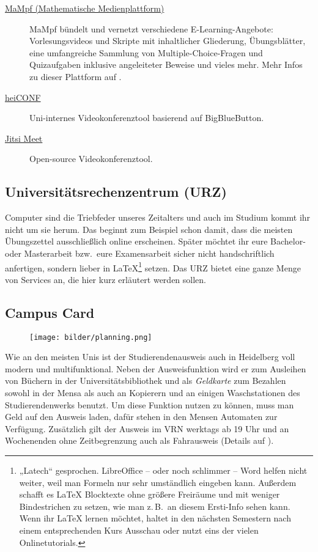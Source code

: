 \begin{description}
	\item[\href{https://mampf.mathi.uni-heidelberg.de}{MaMpf (Mathematische Medienplattform)}]
    MaMpf bündelt und vernetzt verschiedene E-Learning-Angebote: Vorlesungsvideos und Skripte mit inhaltlicher Gliederung, Übungsblätter, eine umfangreiche Sammlung von Multiple-Choice-Fragen und Quizaufgaben inklusive angeleiteter Beweise und vieles mehr. Mehr Infos zu dieser Plattform auf .

	\item[\href{https://heiconf.uni-heidelberg.de}{heiCONF}]
    Uni-internes Videokonferenztool basierend auf BigBlueButton.

	\item[\href{https://meet.jit.si/}{Jitsi Meet}]
    Open-source Videokonferenztool.
\end{description}


\subsection{Universitätsrechenzentrum (URZ)}
\label{urz}
Computer sind die Triebfeder unseres Zeitalters und auch im Studium kommt ihr nicht um sie herum. Das beginnt zum Beispiel schon damit, dass die meisten Übungszettel ausschließlich online erscheinen. Später möchtet ihr eure Bachelor- oder Masterarbeit bzw.\ eure Examensarbeit sicher nicht handschriftlich anfertigen, sondern lieber in \LaTeX \footnote{„Latech“ gesprochen. LibreOffice -- oder noch schlimmer -- Word helfen nicht weiter, weil man Formeln nur sehr umständlich eingeben kann. Außerdem schafft es \LaTeX{} Blocktexte ohne größere Freiräume und mit weniger Bindestrichen zu setzen, wie man z.\,B.\ an diesem Ersti-Info sehen kann. Wenn ihr \LaTeX{} lernen möchtet, haltet in den nächsten Semestern nach einem entsprechenden Kurs Ausschau oder nutzt eins der vielen Onlinetutorials.} setzen. Das \gls{URZ} bietet eine ganze Menge von Services an, die hier kurz erläutert werden sollen.

\subsection{Campus Card}
\label{campuscard}

\begin{figure}[b]
    \centering
    \texttt{[image: bilder/planning.png]}
\end{figure}

Wie an den meisten Unis ist der Studierendenausweis auch in Heidelberg voll modern und multifunktional. Neben der Ausweisfunktion wird er zum Ausleihen von Büchern in der Universitätsbibliothek und als \emph{Geldkarte} zum Bezahlen sowohl in der Mensa als auch an Kopierern und an einigen Waschstationen des Studierendenwerks benutzt. Um diese Funktion nutzen zu können, muss man Geld auf den Ausweis laden, dafür stehen in den Mensen Automaten zur Verfügung. Zusätzlich gilt der Ausweis im \gls{VRN} werktags ab 19 Uhr und an Wochenenden ohne Zeitbegrenzung auch als Fahrausweis (Details auf ).


